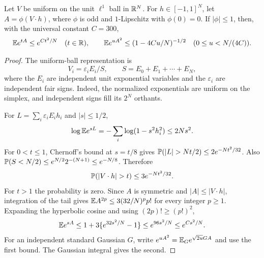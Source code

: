 \begin{lemma}
\label{lem:l1-row}
Let $V$ be uniform on the unit $\ell^1$ ball in $\mathbb R^N$. For $h\in[-1,1]^N$, let $A=\phi(V\cdot h)$, where $\phi$ is odd and $1$-Lipschitz with $\phi(0)=0$. If $|\phi|\leq1$, then, with the universal constant $C=300$,
\[
 \mathbb E e^{tA}\leq e^{Ct^2/N}\quad(t\in\mathbb R),
 \qquad
 \mathbb E e^{uA^2}\leq(1-4Cu/N)^{-1/2}\quad(0\leq u<N/(4C)).
\]
\end{lemma}
\begin{proof}
The uniform-ball representation is
\[
 V_i=\varepsilon_i E_i/S,\qquad S=E_0+E_1+\cdots+E_N,
\]
where the $E_i$ are independent unit exponential variables and the $\varepsilon_i$ are independent fair signs. Indeed, the normalized exponentials are uniform on the simplex, and independent signs fill its $2^N$ orthants.

For $L=\sum_i\varepsilon_iE_i h_i$ and $|s|\leq1/2$,
\[
 \log\mathbb E e^{sL}=-\sum_i\log(1-s^2h_i^2)\leq2Ns^2.
\]
For $0<t\leq1$, Chernoff's bound at $s=t/8$ gives
$\Prob(|L|>Nt/2)\leq2e^{-Nt^2/32}$. Also
$\mathbb P(S<N/2)\leq e^{N/2}2^{-(N+1)}\leq e^{-N/8}$.
Therefore
\[
 \Prob(|V\cdot h|>t)\leq3e^{-Nt^2/32}.
\]
For $t>1$ the probability is zero. Since $A$ is symmetric and $|A|\leq|V\cdot h|$, integration of the tail gives
$\mathbb E A^{2p}\leq3(32/N)^p p!$ for every integer $p\geq1$.
Expanding the hyperbolic cosine and using $(2p)!\geq(p!)^2$,
\[
 \mathbb E e^{sA}
 \leq1+3\{e^{32s^2/N}-1\}\leq e^{96s^2/N}\leq e^{Cs^2/N}.
\]
For an independent standard Gaussian $G$, write
$e^{uA^2}=\mathbb E_G e^{\sqrt{2u}GA}$ and use the first bound. The Gaussian integral gives the second.
\end{proof}

